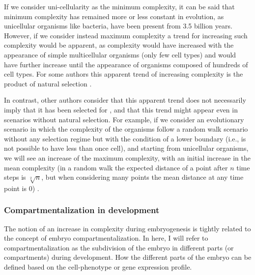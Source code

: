 If we consider uni-cellularity as the minimum complexity, it can be said that minimum complexity has remained more or less constant in evolution, as unicellular organisms like bacteria, have been present from 3.5 billion years. However, if we consider instead maximum complexity a trend for increasing such complexity would be apparent, as complexity would have increased with the appearance of simple multicellular organisms (only few cell types) and would have further increase until the appearance of organisms composed of hundreds of cell types. For some authors this apparent trend of increasing complexity is the product of natural selection \citep{bonner1988evolution,Carroll2001}.

In contrast, other authors consider that this apparent trend does not necessarily imply that it has been selected for \citep{McShea2015}, and that this trend might appear even in scenarios without natural selection. 
For example, if we consider an evolutionary scenario in which the complexity of the organisms follow a random walk scenario without any selection regime but with the condition of a lower boundary (i.e., is not possible to have less than once cell), and starting from unicellular organisms, we will see an increase of the maximum complexity, with an initial increase in the mean complexity (in a random walk the expected distance of a point after $n$ time steps is $\sqrt[2]{n}$, but when considering many points the mean distance at any time point is 0) \citep{gould1996fullhouse}.

\subsubsection{Compartmentalization in development}

The notion of an increase in complexity during embryogenesis is tightly related to the concept of embryo compartmentalization.
%
In here, I will refer to compartmentalization as the subdivision of the embryo in different parts (or compartments) during development. 
How the different parts of the embryo can be defined based on the cell-phenotype or gene expression profile.


